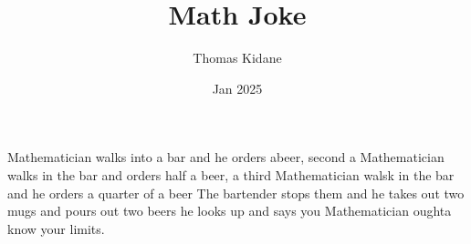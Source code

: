 \documentclass{article}
\title{Math Joke}
\author{Thomas Kidane}
\date{Jan 2025}
\begin{document}
\maketitle
Mathematician walks into a bar and he orders abeer, second a Mathematician walks in the bar and orders half a beer, a third Mathematician walsk in the bar and he orders a quarter of a beer
The bartender stops them and he takes out two mugs and pours out two beers
he looks up and says you Mathematician oughta know your limits.
\end{document}
